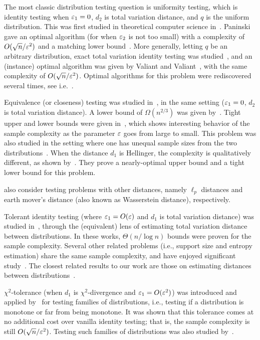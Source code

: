 The most classic distribution testing question is uniformity testing, which is identity testing when $\varepsilon_1 = 0$, $d_2$ is total variation distance, and $q$ is the uniform distribution.
This was first studied in theoretical computer science in~\cite{GoldreichR00}.
Paninski gave an optimal algorithm (for when $\varepsilon_2$ is not too small) with a complexity of $O(\sqrt{n}/\varepsilon^2)$ and a matching lower bound~\cite{Paninski08}.
More generally, letting $q$ be an arbitrary distribution, exact total variation identity testing was studied~\cite{BatuFFKRW01}, and an (instance) optimal algorithm was given by Valiant and Valiant~\cite{ValiantV17}, with the same complexity of $O(\sqrt{n}/\varepsilon^2)$.
Optimal algorithms for this problem were rediscovered several times, see i.e.~\cite{DiakonikolasKN15a, AcharyaDK15, DiakonikolasK16, DiakonikolasGPP16}.

Equivalence (or closeness) testing was studied in~\cite{BatuFRSW13}, in the same setting ($\varepsilon_1 = 0$, $d_2$ is total variation distance).
A lower bound of $\Omega(n^{2/3})$ was given by~\cite{Valiant11}.
Tight upper and lower bounds were given in~\cite{ChanDVV14}, which shows interesting behavior of the sample complexity as the parameter $\varepsilon$ goes from large to small.
This problem was also studied in the setting where one has unequal sample sizes from the two distributions~\cite{BhattacharyaV15,DiakonikolasK16}.
When the distance $d_1$ is Hellinger, the complexity is qualitatively different, as shown by~\cite{DiakonikolasK16}.
They prove a nearly-optimal upper bound and a tight lower bound for this problem.

\cite{Waggoner15, DoBaNNR11} also consider testing problems with other distances, namely $\ell_p$ distances and earth mover's distance (also known as Wasserstein distance), respectively.

Tolerant identity testing (where $\varepsilon_1 = O(\varepsilon)$ and $d_1$ is total variation distance) was studied in~\cite{ValiantV10a,ValiantV10b,ValiantV11a,ValiantV11b}, through the (equivalent) lens of estimating total variation distance between distributions.
In these works, $\Theta\left(n/\log n\right)$ bounds were proven for the sample complexity.
Several other related problems (i.e., support size and entropy estimation) share the same sample complexity, and have enjoyed significant study~\cite{AcharyaOST17, WuY16, AcharyaDOS17}.
The closest related results to our work are those on estimating distances between distributions~\cite{JiaoHW16, JiaoKHW17, HanJW16}.

$\chi^2$-tolerance (when $d_1$ is $\chi^2$-divergence and $\varepsilon_1 = O(\varepsilon^2)$) was introduced and applied by~\cite{AcharyaDK15} for testing families of distributions, i.e., testing if a distribution is monotone or far from being monotone.
It was shown that this tolerance comes at no additional cost over vanilla identity testing; that is, the sample complexity is still $O(\sqrt{n}/\varepsilon^2)$.
Testing such families of distributions was also studied by~\cite{CanonneDGR16}.

